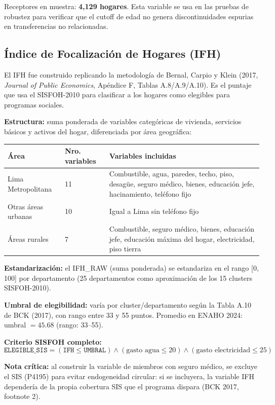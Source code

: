 \documentclass[12pt, a4paper]{article}
\begin{document}
Receptores en muestra: \textbf{4{,}129 hogares}. Esta variable se usa en
las pruebas de robustez para verificar que el cutoff de edad no genera
discontinuidades espurias en transferencias no relacionadas.

\subsection{Índice de Focalización de Hogares (IFH)}

El IFH fue construido replicando la metodología de Bernal, Carpio y Klein
(2017, \textit{Journal of Public Economics}, Apéndice F, Tablas A.8/A.9/A.10).
Es el puntaje que usa el SISFOH-2010 para clasificar a los hogares como
elegibles para programas sociales.

\textbf{Estructura:} suma ponderada de variables categóricas de vivienda,
servicios básicos y activos del hogar, diferenciada por área geográfica:

\begin{center}
\begin{tabular}{llp{7cm}}
\toprule
Área & Nro. variables & Variables incluidas \\\midrule
Lima Metropolitana & 11 & Combustible, agua, paredes, techo, piso, desagüe, seguro médico, bienes, educación jefe, hacinamiento, teléfono fijo \\
Otras áreas urbanas & 10 & Igual a Lima sin teléfono fijo \\
Áreas rurales & 7 & Combustible, seguro médico, bienes, educación jefe, educación máxima del hogar, electricidad, piso tierra \\
\bottomrule
\end{tabular}
\end{center}

\textbf{Estandarización:} el IFH\_RAW (suma ponderada) se estandariza en el
rango [0, 100] por departamento (25 departamentos como aproximación de los
15 clusters SISFOH-2010).

\textbf{Umbral de elegibilidad:} varía por cluster/departamento según la
Tabla A.10 de BCK (2017), con rango entre 33 y 55 puntos. Promedio en
ENAHO 2024: umbral $= 45.68$ (rango: 33--55).

\textbf{Criterio SISFOH completo:}
$$\texttt{ELEGIBLE\_SIS} = (\texttt{IFH} \leq \texttt{UMBRAL}) \wedge (\text{gasto agua} \leq 20) \wedge (\text{gasto electricidad} \leq 25)$$

\textbf{Nota crítica:} al construir la variable de miembros con seguro médico,
se excluye el SIS (P4195) para evitar endogeneidad circular: si se incluyera,
la variable IFH dependería de la propia cobertura SIS que el programa
dispara (BCK 2017, footnote 2).
\end{document}
